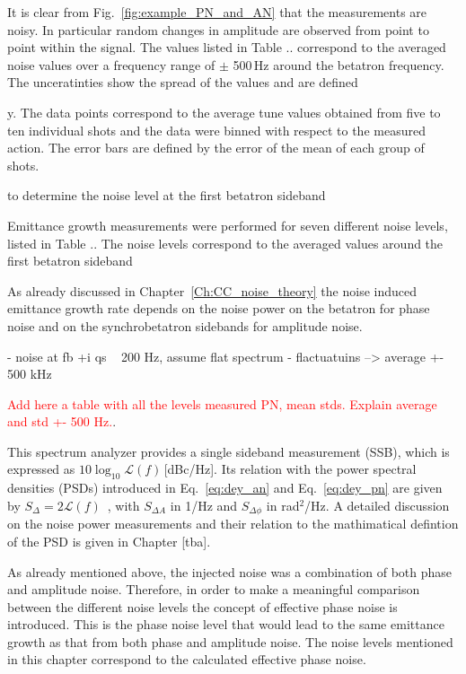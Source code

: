 \begin{sloppypar} 
It is clear from Fig.~\ref{fig:example_PN_and_AN} that the measurements are noisy. In particular random changes in amplitude are observed from point to point within the signal. The values listed in Table .. correspond to the averaged noise values over a frequency range of $\pm$ 500\,Hz around the betatron frequency. The unceratinties show the spread of the values and are defined 
\end{sloppypar} 
y. The data points correspond to the average tune values obtained from
five to ten individual shots and the data were binned with respect to the measured action. The error
bars are defined by the error of the mean of each group of shots.

to determine the noise level at the first betatron sideband 


Emittance growth measurements were performed for seven different noise levels, listed in Table .. The noise levels correspond to the averaged values around the first betatron sideband

As already discussed in Chapter~\ref{Ch:CC_noise_theory} the noise induced emittance growth rate depends on the noise power on the betatron for phase noise and on the synchrobetatron sidebands for amplitude noise. 

- noise at fb +i qs ~ 200 Hz, assume flat spectrum
- flactuatuins --> average +- 500 kHz






\textcolor{red}{Add here a table with all the levels measured PN, mean stds. Explain average and std +- 500 Hz.}.


\begin{sloppypar} %
This spectrum analyzer provides a single sideband measurement (SSB), which is expressed as $10\log_{10}\mathcal{L}(f)$\,[dBc/Hz]. Its relation with the power spectral densities (PSDs) introduced in Eq.~\eqref{eq:dey_an} and Eq.~\eqref{eq:dey_pn} are given by $S_\Delta = 2\mathcal{L}(f)$~\cite{IEEE:4797525}, with $S_{\Delta A}$ in 1/Hz and $S_{\Delta\phi}$ in rad$^2$/Hz. A detailed discussion on the noise power measurements and their relation to the mathimatical defintion of the PSD is given in Chapter [tba].

As already mentioned above, the injected noise was a combination of both phase and amplitude noise. Therefore, in order to make a meaningful comparison between the different noise levels the concept of effective phase noise is introduced. This is the phase noise level that would lead to
the same emittance growth as that from both phase and
amplitude noise. The noise levels mentioned in this chapter correspond to the calculated effective phase noise.
\end{sloppypar} 



